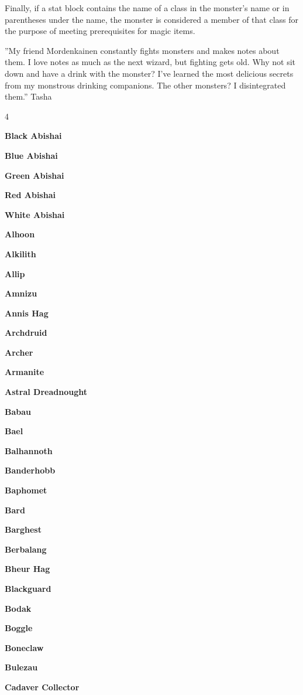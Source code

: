 \documentclass[10pt,a4paper,twoside,bg=print,twocolumn,openany,nodeprecatedcode]{dndbook}
\begin{document}
Finally, if a stat block contains the name of a class in the monster's name or in parentheses under the name, the monster is considered a member of that class for the purpose of meeting prerequisites for magic items.

\DndQuote%
{}
{''My friend Mordenkainen constantly fights monsters and makes notes about them. I love notes as much as the next wizard, but fighting gets old. Why not sit down and have a drink with the monster? I've learned the most delicious secrets from my monstrous drinking companions. The other monsters? I disintegrated them.''}
{Tasha}

\begin{itemize}
\begin{multicols}{4}
\item \textbf{Black Abishai}
\item \textbf{Blue Abishai}
\item \textbf{Green Abishai}
\item \textbf{Red Abishai}
\item \textbf{White Abishai}
\item \textbf{Alhoon}
\item \textbf{Alkilith}
\item \textbf{Allip}
\item \textbf{Amnizu}
\item \textbf{Annis Hag}
\item \textbf{Archdruid}
\item \textbf{Archer}
\item \textbf{Armanite}
\item \textbf{Astral Dreadnought}
\item \textbf{Babau}
\item \textbf{Bael}
\item \textbf{Balhannoth}
\item \textbf{Banderhobb}
\item \textbf{Baphomet}
\item \textbf{Bard}
\item \textbf{Barghest}
\item \textbf{Berbalang}
\item \textbf{Bheur Hag}
\item \textbf{Blackguard}
\item \textbf{Bodak}
\item \textbf{Boggle}
\item \textbf{Boneclaw}
\item \textbf{Bulezau}
\item \textbf{Cadaver Collector}

\end{multicols}
\end{itemize}
\end{document}

